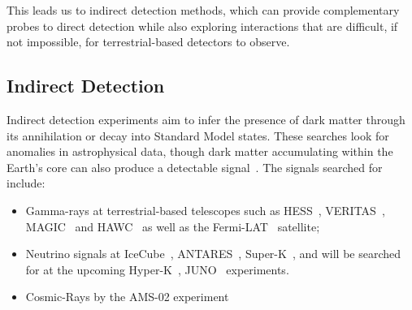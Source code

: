 This leads us to indirect detection methods, which can provide complementary probes to direct detection while also exploring interactions that are difficult, if not impossible, for terrestrial-based detectors to observe.
\subsection{Indirect Detection}

Indirect detection experiments aim to infer the presence of dark matter through its annihilation or decay into Standard Model states. 
These searches look for anomalies in astrophysical data, though dark matter accumulating within the Earth's core can also produce a detectable signal~\cite{Lee:2013iua_jan_Constrainingdarkmatter,ANTARES:2016bxz_jun_SearchDarkMatter}. The signals searched for include: 
\begin{itemize}
    \item Gamma-rays at terrestrial-based telescopes such as HESS~\cite{HESS:2018cbt_may_SearchgRayLine, Montanari:2023bzn_jul_Searchdarkmatter, HESS:2006zwn_ObservationsGalacticCenter}, VERITAS~\cite{VERITAS:2017tif_apr_DarkMatterConstraints, Ryan:2023yzu_jul_SearchDarkMatter, McGrath:2023oto_jul_IndirectsearchDark, Ryan:2023yzu_jul_SearchDarkMatter}, MAGIC~\cite{MAGIC:2009tyk_MAGICGammaRayTelescope, MAGIC:2011nta_SearchesDarkMatter, MAGIC:2011nta_SearchesDarkMatter, MAGIC:2009tyk_MAGICGammaRayTelescope} and HAWC~\cite{HAWC:2017mfa_feb_DarkMatterLimits, HAWC:2017udy_feb_SearchDarkMatter, HAWC:2017udy_feb_SearchDarkMatter, HAWC:2017mfa_feb_DarkMatterLimits, Proper:2015xya_jul_FirstLimitsDark, Harding:2015bua_jul_DarkMatterAnnihilation} as well as the Fermi-LAT~\cite{Fermi-LAT:2015att_nov_SearchingDarkMatter,Fermi-LAT:2015kyq_jun_UpdatedSearchSpectral,Fermi-LAT:2012ugx_FermiLATSearch, Fermi-LAT:2010qeq_ConstraintsCosmologicalDark, Su:2010qj_GiantGammarayBubbles} satellite;

    \item Neutrino signals at IceCube~\cite{IceCube:2016dgk_mar_Searchannihilatingdark, IceCube:2012ugg_mar_Searchdarkmatter}, ANTARES~\cite{ANTARES:2016bxz_jun_SearchDarkMatter,ANTARES:2016obx_may_SearchSecludedDark,ANTARES:2016xuh_aug_LimitsDarkMatter}, Super-K~\cite{Super-Kamiokande:2015xms_apr_Searchneutrinosannihilation,Super-Kamiokande:2004pou_Searchdarkmatter,Feng:2008qn_TestingDarkMatter}, and will be searched for at the upcoming Hyper-K~\cite{Bell:2020rkw_sep_SearchingSubGeVDark,Bell:2021esh_nov_Searchingdarkmatter,Bell:2022ycf_nov_Darkmatterpollution}, JUNO~\cite{Franarin:2018gfk_jun_JUNOSensitivityResonant} experiments.

    \item Cosmic-Rays by the AMS-02 experiment~\cite{Giesen:2015ufa_sep_AMS02antiprotonslast, Bergstrom:2013jra_oct_NewLimitsDark}
\end{itemize}

